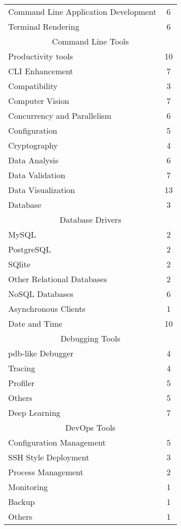 \begin{longtable} {|l|c|}
    \hline
    Command Line Application Development & 6\\
    Terminal Rendering & 6\\
    \hline
    \multicolumn{2}{|c|}{Command Line Tools}\\
    \hline
    Productivity tools & 10\\
    CLI Enhancement & 7\\
    \hline
    Compatibility & 3\\
    \hline
    Computer Vision & 7\\
    \hline
    Concurrency and Parallelism & 6\\
    \hline
    Configuration & 5\\
    \hline
    Cryptography & 4\\
    \hline
    Data Analysis & 6\\
    \hline
    Data Validation & 7\\
    \hline
    Data Visualization & 13\\
    \hline
    Database & 3\\
    \hline
    \multicolumn{2}{|c|}{Database Drivers}\\
    \hline
    MySQL & 2\\
    PostgreSQL  & 2\\
    SQlite & 2\\
    Other Relational Databases & 2\\
    NoSQL Databases & 6\\
    Asynchronous Clients & 1\\
    \hline
    Date and Time & 10\\
    \hline
    \multicolumn{2}{|c|}{Debugging Tools}\\
    \hline
    pdb-like Debugger & 4\\
    Tracing & 4\\
    Profiler & 5\\
    Others & 5\\
    \hline
    Deep Learning & 7\\
    \hline
    \multicolumn{2}{|c|}{DevOps Tools}\\
    \hline
    Configuration Management & 5\\
    SSH Style Deployment & 3\\
    Process Management & 2\\
    Monitoring & 1\\
    Backup & 1\\
    Others & 1\\
    \hline

\end{longtable}
